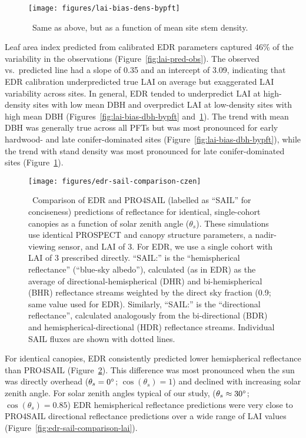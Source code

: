 \begin{figure}
  \centering
  \texttt{[image: figures/lai-bias-dens-bypft]}
  \caption{\
    Same as above, but as a function of mean site stem density.
  }\label{fig:lai-bias-dens-bypft}
\end{figure}

Leaf area index predicted from calibrated EDR parameters captured 46\% of the variability in the observations (Figure~\ref{fig:lai-pred-obs}).
The observed vs.\ predicted line had a slope of 0.35 and an intercept of 3.09, indicating that EDR calibration underpredicted true LAI on average but exaggerated LAI variability across sites.
In general, EDR tended to underpredict LAI at high-density sites with low mean DBH and overpredict LAI at low-density sites with high mean DBH (Figures~\ref{fig:lai-bias-dbh-bypft} and~\ref{fig:lai-bias-dens-bypft}).
The trend with mean DBH was generally true across all PFTs but was most pronounced for early hardwood- and late conifer-dominated sites (Figure~\ref{fig:lai-bias-dbh-bypft}),
while the trend with stand density was most pronounced for late conifer-dominated sites (Figure~\ref{fig:lai-bias-dens-bypft}).

\begin{figure}
  \centering
  \texttt{[image: figures/edr-sail-comparison-czen]}
  \caption{\label{fig:edr-sail-comparison-czen}\
    Comparison of EDR and PRO4SAIL (labelled as ``SAIL'' for conciseness) predictions of reflectance for identical, single-cohort canopies as a function of solar zenith angle ($\theta_{s}$).
    These simulations use identical PROSPECT and canopy structure parameters, a nadir-viewing sensor, and LAI of 3.
    For EDR, we use a single cohort with LAI of 3 prescribed directly.\@
    ``SAIL:\@HR'' is the ``hemispherical reflectance'' (``blue-sky albedo''), calculated (as in EDR) as the average of directional-hemispherical (DHR) and bi-hemispherical (BHR) reflectance streams weighted by the direct sky fraction (0.9; same value used for EDR).
    Similarly, ``SAIL:\@DR'' is the ``directional reflectance'', calculated analogously from the bi-directional (BDR) and hemispherical-directional (HDR) reflectance streams.
    Individual SAIL fluxes are shown with dotted lines.
  }
\end{figure}

For identical canopies, EDR consistently predicted lower hemispherical reflectance than PRO4SAIL (Figure~\ref{fig:edr-sail-comparison-czen}).
This difference was most pronounced when the sun was directly overhead ($\theta_{s} = 0^{\circ}$; $\cos(\theta_{s}) = 1$) and declined with increasing solar zenith angle.
For solar zenith angles typical of our study, ($\theta_{s} \approx 30^{\circ}$; $\cos(\theta_{s}) = 0.85$) EDR hemispherical reflectance predictions were very close to PRO4SAIL directional reflectance predictions over a wide range of LAI values (Figure~\ref{fig:edr-sail-comparison-lai}).
